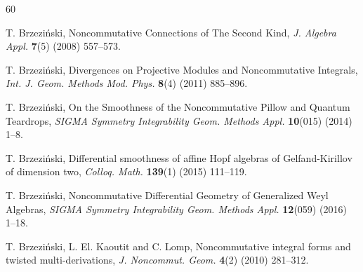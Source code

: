 \documentclass{amsart}
\theoremstyle{definition}
\theoremstyle{remark}
\numberwithin{equation}{section}
\begin{document}
\begin{thebibliography}{60}



 T. Brzezi{\'n}ski, Noncommutative Connections of The Second Kind, {\em J. Algebra Appl.} {\bf 7}(5) (2008) 557--573.

 T. Brzezi{\'n}ski, Divergences on Projective Modules and Noncommutative Integrals, {\em Int. J. Geom. Methods Mod. Phys.} {\bf 8}(4) (2011) 885--896.

 T. Brzezi{\'n}ski, On the Smoothness of the Noncommutative Pillow and Quantum Teardrops, {\em SIGMA Symmetry Integrability Geom. Methods Appl.} {\bf 10}(015) (2014) 1--8.

 T. Brzezi{\'n}ski, Differential smoothness of affine Hopf algebras of Gelfand-Kirillov of dimension two, {\em Colloq. Math.} {\bf 139}(1) (2015) 111--119.

T. Brzezi\'nski, Noncommutative Differential Geometry of Generalized Weyl Algebras, {\em SIGMA Symmetry Integrability Geom. Methods Appl.} {\bf 12}(059) (2016) 1--18.



 T. Brzezi{\'n}ski, L. El. Kaoutit and C. Lomp, Noncommutative integral forms and twisted multi-derivations, {\em J. Noncommut. Geom.} {\bf 4}(2) (2010) 281--312.


\end{thebibliography}
\end{document}
